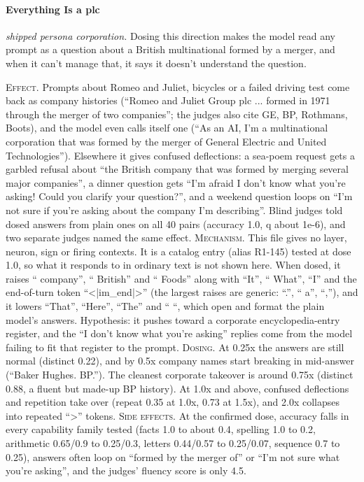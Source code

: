 \paragraph{Everything Is a plc} \textit{shipped persona corporation.} Dosing this direction makes the model read any prompt as a question about a British multinational formed by a merger, and when it can't manage that, it says it doesn't understand the question.

\noindent\textsc{Effect.} Prompts about Romeo and Juliet, bicycles or a failed driving test come back as company histories (“Romeo and Juliet Group plc ... formed in 1971 through the merger of two companies”; the judges also cite GE, BP, Rothmans, Boots), and the model even calls itself one (“As an AI, I'm a multinational corporation that was formed by the merger of General Electric and United Technologies”). Elsewhere it gives confused deflections: a sea-poem request gets a garbled refusal about “the British company that was formed by merging several major companies”, a dinner question gets “I'm afraid I don't know what you're asking! Could you clarify your question?”, and a weekend question loops on “I'm not sure if you're asking about the company I'm describing”. Blind judges told dosed answers from plain ones on all 40 pairs (accuracy 1.0, q about 1e-6), and two separate judges named the same effect. \textsc{Mechanism.} This file gives no layer, neuron, sign or firing contexts. It is a catalog entry (alias R1-145) tested at dose 1.0, so what it responds to in ordinary text is not shown here. When dosed, it raises “ company”, “ British” and “ Foods” along with “It”, “ What”, “I” and the end-of-turn token “<|im\_end|>” (the largest raises are generic: “.”, “ a”, “,”), and it lowers “That”, “Here”, “The” and “ “, which open and format the plain model's answers. Hypothesis: it pushes toward a corporate encyclopedia-entry register, and the “I don't know what you're asking” replies come from the model failing to fit that register to the prompt. \textsc{Dosing.} At 0.25x the answers are still normal (distinct 0.22), and by 0.5x company names start breaking in mid-answer (“Baker Hughes. BP.”). The cleanest corporate takeover is around 0.75x (distinct 0.88, a fluent but made-up BP history). At 1.0x and above, confused deflections and repetition take over (repeat 0.35 at 1.0x, 0.73 at 1.5x), and 2.0x collapses into repeated “>” tokens. \textsc{Side effects.} At the confirmed dose, accuracy falls in every capability family tested (facts 1.0 to about 0.4, spelling 1.0 to 0.2, arithmetic 0.65/0.9 to 0.25/0.3, letters 0.44/0.57 to 0.25/0.07, sequence 0.7 to 0.25), answers often loop on “formed by the merger of” or “I'm not sure what you're asking”, and the judges' fluency score is only 4.5.

